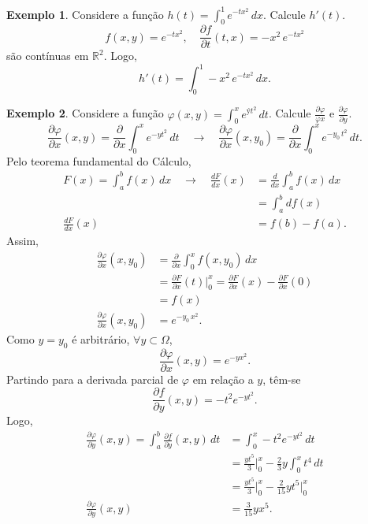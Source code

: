 \documentclass[11pt]{article}
\theoremstyle{definition}
\newtheorem{exemplo}{Exemplo}[subsection]
\begin{document}
	\begin{exemplo}
		Considere a função $h(t)=\int_{0}^{1}e^{-tx^2}\,dx$. Calcule $h'(t)$.
		\begin{equation*}
			f(x,y)=e^{-tx^2},\quad \frac{\partial f}{\partial t}(t,x)=-x^2\, e^{-tx^2}
		\end{equation*}
		são contínuas em $\mathbb{R}^2$. Logo,
		\begin{equation*}
			h'(t)=\int_{0}^{1}-x^2\, e^{-tx^2}\, dx.
		\end{equation*}
	\end{exemplo}
	\begin{exemplo}
		Considere a função $\varphi(x,y)=\int_{0}^{x}e^{ýt^2}\, dt$. Calcule $\frac{\partial \varphi}{\varphi x}$ e $\frac{\partial \varphi}{\partial y}$.
		\begin{equation*}
			\frac{\partial \varphi}{\partial x}(x,y)=\frac{\partial}{\partial x}\int_{0}^{x}e^{-yt^2}\, dt\quad\longrightarrow\quad \frac{\partial \varphi}{\partial x}(x,y_0)=\frac{\partial}{\partial x}\int_{0}^{x}e^{-y_0\, t^2}\, dt.
		\end{equation*}
		Pelo teorema fundamental do Cálculo,
		\begin{align*}
			F(x)=\int_{a}^{b}f(x)\, dx \quad\longrightarrow\quad \frac{dF}{dx}(x)&=\frac{d}{dx}\int_{a}^{b}f(x)\,dx\\
			&=\int_{a}^{b}df(x)\\
			\frac{dF}{dx}(x)&=f(b)-f(a).
		\end{align*}
		Assim,
		\begin{align*}
			\frac{\partial \varphi}{\partial x}(x,y_0)&=\frac{\partial}{\partial x}\int_{0}^{x}f(x,y_0)\, dx\\
			&=\frac{\partial F}{\partial x}(t)\Big|_{0}^{x}=\frac{\partial F}{\partial x}(x)-\frac{\partial F}{\partial x}(0)\\
			&=f(x)\\
			\frac{\partial \varphi}{\partial x}(x,y_0)&=e^{-y_0\, x^2}.
		\end{align*}
		Como $y=y_0$ é arbitrário, $\forall y\subset \Omega$,
		\begin{equation*}
			\frac{\partial \varphi}{\partial x}(x,y)=e^{-yx^2}.
		\end{equation*}
		Partindo para a derivada parcial de $\varphi$ em relação a $y$, têm-se
		\begin{equation*}
			\frac{\partial f}{\partial y}(x,y)=-t^2 e^{-yt^2}.
		\end{equation*}
		Logo,
		\begin{align*}
			\frac{\partial \varphi}{\partial y}(x,y)=\int_{a}^{b}\frac{\partial f}{\partial y}(x,y)\, dt&=\int_{0}^{x}-t^2 e^{-yt^2}\, dt\\
			&=\frac{yt^5}{3}\Big|_{0}^{x}-\frac{2}{3}y\int_{0}^{x} t^4\, dt\\
			&=\frac{yt^5}{3}\Big|_{0}^{x}-\frac{2}{15}yt^5\Big|_{0}^{x}\\
			\frac{\partial \varphi}{\partial y}(x,y)&=\frac{3}{15}yx^5.
		\end{align*}
	\end{exemplo}
\end{document}
